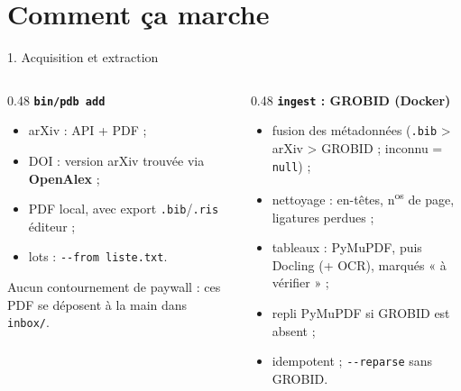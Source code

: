 \documentclass[aspectratio=169,11pt]{beamer}
\newcommand{\cmd}[1]{\texttt{\textcolor{blu}{#1}}}
\begin{document}
\section{Comment ça marche}

\begin{frame}{1. Acquisition et extraction}
  \begin{columns}[T]
    \begin{column}{0.48\textwidth}
      \textbf{\cmd{bin/pdb add}}
      \begin{itemize}
        \item arXiv : API + PDF ;
        \item DOI : version arXiv trouvée via \textbf{OpenAlex} ;
        \item PDF local, avec export \texttt{.bib}/\texttt{.ris} éditeur ;
        \item lots : \cmd{-{}-from liste.txt}.
      \end{itemize}
      \medskip
      {\small Aucun contournement de paywall : ces PDF se déposent à la main dans \texttt{inbox/}.}
    \end{column}
    \begin{column}{0.48\textwidth}
      \textbf{\cmd{ingest} : GROBID (Docker)}
      \begin{itemize}
        \item fusion des métadonnées (\texttt{.bib} > arXiv > GROBID ; inconnu = \texttt{null}) ;
        \item nettoyage : en-têtes, n\textsuperscript{os} de page, ligatures perdues ;
        \item tableaux : PyMuPDF, puis Docling (+ OCR), marqués « à vérifier » ;
        \item repli PyMuPDF si GROBID est absent ;
        \item idempotent ; \cmd{-{}-reparse} sans GROBID.
      \end{itemize}
    \end{column}
  \end{columns}
\end{frame}
\end{document}
